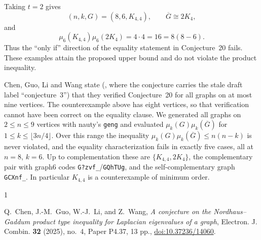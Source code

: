 \documentclass[11pt]{amsart}
\begin{document}
Taking $t=2$ gives
\[
(n,k,G)=(8,6,K_{4,4}),\qquad \overline G\cong2K_4,
\]
and
\[
\mu_6(K_{4,4})\mu_6(2K_4)=4\cdot4=16=8(8-6).
\]
Thus the ``only if'' direction of the equality statement in
Conjecture~20 fails. These examples attain the proposed upper bound and do
not violate the product inequality.

Chen, Guo, Li and Wang state (\cite[Remark~1]{CGLW}, where the conjecture
carries the stale draft label ``conjecture~3'') that they verified
Conjecture~20 for all graphs on at most nine vertices. The counterexample
above has eight vertices, so that verification cannot have been correct on
the equality clause. We generated all graphs on $2\le n\le9$ vertices with
nauty's \texttt{geng} and evaluated $\mu_k(G)\mu_k(\overline G)$ for
$1\le k\le\lfloor3n/4\rfloor$. Over this range the inequality
$\mu_k(G)\mu_k(\overline G)\le n(n-k)$ is never violated, and the equality
characterization fails in exactly five cases, all at $n=8$, $k=6$. Up to complementation these are $\{K_{4,4},2K_4\}$, the
complementary pair with graph6 codes \texttt{G?zvf\_}/\texttt{GQhTUg}, and
the self-complementary graph \texttt{GCXnf\_}. In particular $K_{4,4}$ is a
counterexample of minimum order.

\begin{thebibliography}{1}

Q.~Chen, J.-M.~Guo, W.-J.~Li, and Z.~Wang,
\emph{A conjecture on the Nordhaus--Gaddum product type inequality for
Laplacian eigenvalues of a graph},
Electron. J. Combin. \textbf{32} (2025), no.~4, Paper P4.37, 13 pp.,
\href{https://doi.org/10.37236/14060}{doi:10.37236/14060}.

\end{thebibliography}
\end{document}
